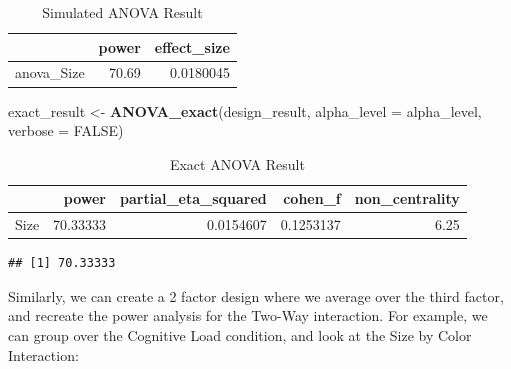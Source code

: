 \documentclass[
]{book}
\newenvironment{Shaded}{\begin{snugshade}}{\end{snugshade}}
\newcommand{\CommentTok}[1]{\textcolor[rgb]{0.56,0.35,0.01}{\textit{#1}}}
\newcommand{\DataTypeTok}[1]{\textcolor[rgb]{0.13,0.29,0.53}{#1}}
\newcommand{\KeywordTok}[1]{\textcolor[rgb]{0.13,0.29,0.53}{\textbf{#1}}}
\newcommand{\NormalTok}[1]{#1}
\newcommand{\OperatorTok}[1]{\textcolor[rgb]{0.81,0.36,0.00}{\textbf{#1}}}
\newcommand{\OtherTok}[1]{\textcolor[rgb]{0.56,0.35,0.01}{#1}}
\newcommand{\StringTok}[1]{\textcolor[rgb]{0.31,0.60,0.02}{#1}}
\begin{document}
\begin{table}[!h]

\caption{\label{tab:unnamed-chunk-174}Simulated ANOVA Result}
\centering
\begin{tabular}[t]{l|r|r}
\hline
  & power & effect\_size\\
\hline
anova\_Size & 70.69 & 0.0180045\\
\hline
\end{tabular}
\end{table}

\begin{Shaded}
\begin{Highlighting}[]
\NormalTok{exact_result <-}\StringTok{ }\KeywordTok{ANOVA_exact}\NormalTok{(design_result,}
                            \DataTypeTok{alpha_level =}\NormalTok{ alpha_level,}
                            \DataTypeTok{verbose =} \OtherTok{FALSE}\NormalTok{)}
\end{Highlighting}
\end{Shaded}

\begin{table}[!h]

\caption{\label{tab:unnamed-chunk-176}Exact ANOVA Result}
\centering
\begin{tabular}[t]{l|r|r|r|r}
\hline
  & power & partial\_eta\_squared & cohen\_f & non\_centrality\\
\hline
Size & 70.33333 & 0.0154607 & 0.1253137 & 6.25\\
\hline
\end{tabular}
\end{table}

\begin{Shaded}
\end{Shaded}

\begin{verbatim}
## [1] 70.33333
\end{verbatim}

Similarly, we can create a 2 factor design where we average over the third factor, and recreate the power analysis for the Two-Way interaction. For example, we can group over the Cognitive Load condition, and look at the Size by Color Interaction:
\end{document}

